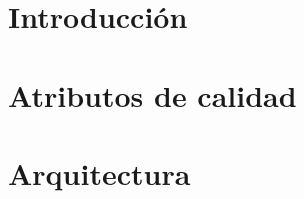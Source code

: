 \documentclass[10pt, a4paper]{article}
\begin{document}
\maketitle
\tableofcontents
\newpage

\section{Introducción}

\section{Atributos de calidad}
	

\section{Arquitectura}

	
\end{document}
